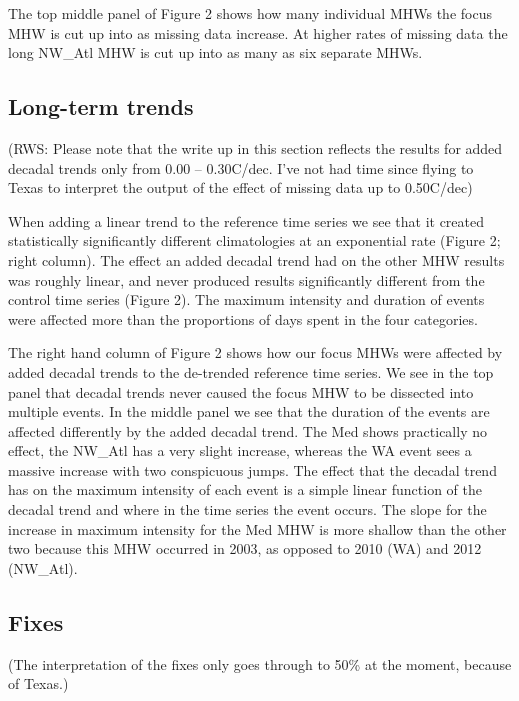 \documentclass[]{article}
\begin{document}
The top middle panel of Figure 2 shows how many individual MHWs the
focus MHW is cut up into as missing data increase. At higher rates of
missing data the long NW\_Atl MHW is cut up into as many as six separate
MHWs.

\hypertarget{long-term-trends}{%
\subsection{Long-term trends}\label{long-term-trends}}

(RWS: Please note that the write up in this section reflects the results
for added decadal trends only from 0.00 -- 0.30C/dec. I've not had time
since flying to Texas to interpret the output of the effect of missing
data up to 0.50C/dec)

When adding a linear trend to the reference time series we see that it
created statistically significantly different climatologies at an
exponential rate (Figure 2; right column). The effect an added decadal
trend had on the other MHW results was roughly linear, and never
produced results significantly different from the control time series
(Figure 2). The maximum intensity and duration of events were affected
more than the proportions of days spent in the four categories.

The right hand column of Figure 2 shows how our focus MHWs were affected
by added decadal trends to the de-trended reference time series. We see
in the top panel that decadal trends never caused the focus MHW to be
dissected into multiple events. In the middle panel we see that the
duration of the events are affected differently by the added decadal
trend. The Med shows practically no effect, the NW\_Atl has a very
slight increase, whereas the WA event sees a massive increase with two
conspicuous jumps. The effect that the decadal trend has on the maximum
intensity of each event is a simple linear function of the decadal trend
and where in the time series the event occurs. The slope for the
increase in maximum intensity for the Med MHW is more shallow than the
other two because this MHW occurred in 2003, as opposed to 2010 (WA) and
2012 (NW\_Atl).

\hypertarget{fixes}{%
\subsection{Fixes}\label{fixes}}

(The interpretation of the fixes only goes through to 50\% at the
moment, because of Texas.)
\end{document}

